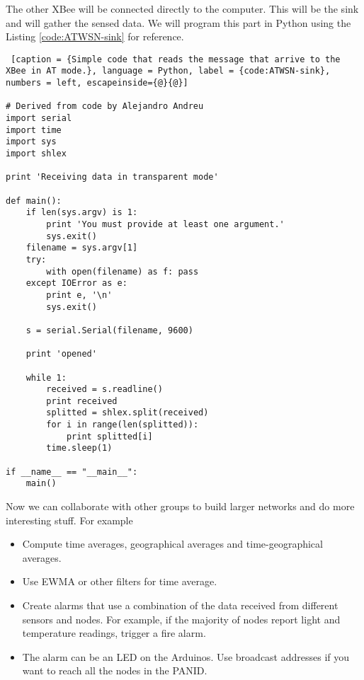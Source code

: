 The other XBee will be connected directly to the computer.
This will be the sink and will gather the sensed data.
We will program this part in Python using the Listing \ref{code:ATWSN-sink} for reference.


\begin{lstlisting} [caption = {Simple code that reads the message that arrive to the XBee in AT mode.}, language = Python, label = {code:ATWSN-sink}, numbers = left, escapeinside={@}{@}]

# Derived from code by Alejandro Andreu
import serial
import time
import sys
import shlex

print 'Receiving data in transparent mode'

def main():
    if len(sys.argv) is 1:
        print 'You must provide at least one argument.'
        sys.exit()
    filename = sys.argv[1]
    try:
        with open(filename) as f: pass
    except IOError as e:
        print e, '\n'
        sys.exit()

    s = serial.Serial(filename, 9600)

    print 'opened'

    while 1:
        received = s.readline()
        print received
        splitted = shlex.split(received)
        for i in range(len(splitted)):
            print splitted[i]
        time.sleep(1)

if __name__ == "__main__":
    main()
\end{lstlisting}

Now we can collaborate with other groups to build larger networks and do more interesting stuff.
For example
\begin{itemize}
\item Compute time averages, geographical averages and time-geographical averages.
\item Use EWMA or other filters for time average.
\item Create alarms that use a combination of the data received from different sensors and nodes. 
For example, if the majority of nodes report light and temperature readings, trigger a fire alarm.
\item The alarm can be an LED on the Arduinos.
Use broadcast addresses if you want to reach all the nodes in the PANID.
\end{itemize}
